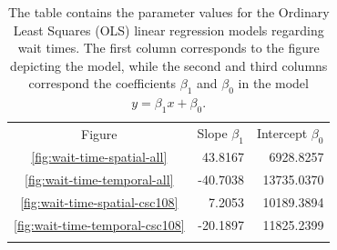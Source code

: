 \begin{table}
\caption{The table contains the parameter values for the Ordinary Least Squares
(OLS) linear regression models regarding wait times. The first column
corresponds to the figure depicting the model, while the second and third
columns correspond the coefficients $\beta_1$ and $\beta_0$ in the model
$y = \beta_{1}x + \beta_0$.}
\label{tab:wait-time-params}       %
\begin{tabular}{crr}
\hline\noalign{\smallskip}
Figure  & Slope $\beta_1$ & Intercept $\beta_0$  \\
\noalign{\smallskip}\hline\noalign{\smallskip}
\ref{fig:wait-time-spatial-all}     &    43.8167    &    6928.8257  \\
\ref{fig:wait-time-temporal-all}    &   -40.7038    &   13735.0370  \\
\ref{fig:wait-time-spatial-csc108}  &     7.2053    &   10189.3894  \\
\ref{fig:wait-time-temporal-csc108} &   -20.1897    &   11825.2399  \\
\noalign{\smallskip}\hline
\end{tabular}
\end{table}






